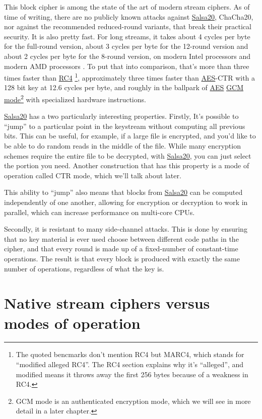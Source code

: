\documentclass[11pt,ebook,table,dvipsnames]{memoir}
\begin{document}
This block cipher is among the state of the art of modern stream
ciphers. As of time of writing, there are no publicly known attacks
against \hyperref[Salsa20]{Salsa20}, ChaCha20, nor against the recommended reduced-round
variants, that break their practical security. It is also pretty fast.
For long streams, it takes about 4 cycles per byte for the full-round
version, about 3 cycles per byte for the 12-round version and about 2
cycles per byte for the 8-round version, on modern Intel processors
\cite{salsa20:speed} and modern AMD processors \cite{cryptopp:bench}.
To put that into comparison, that's more than three times faster than
\hyperref[RC4]{RC4} \footnote{The quoted bencmarks don't mention RC4 but MARC4, which
stands for \enquote{modified alleged RC4}. The RC4 section explains why it's
\enquote{alleged}, and modified means it throws away the first 256 bytes
because of a weakness in RC4.}, approximately three times faster than
\hyperref[AES]{AES}-CTR with a 128 bit key at 12.6 cycles per byte, and roughly in the
ballpark of \hyperref[AES]{AES} \hyperref[GCM-mode]{GCM mode}\footnote{GCM mode is an authenticated encryption
mode, which we will see in more detail in a later chapter.} with
specialized hardware instructions.

\label{keystream-jump}
\hyperref[Salsa20]{Salsa20} has a two particularly interesting properties. Firstly, It's
possible to \enquote{jump} to a particular point in the keystream without
computing all previous bits. This can be useful, for example, if a
large file is encrypted, and you'd like to be able to do random reads
in the middle of the file. While many encryption schemes require the
entire file to be decrypted, with \hyperref[Salsa20]{Salsa20}, you can just select the
portion you need. Another construction that has this property is a
mode of operation called \gls{CTR mode}, which we'll talk about later.

This ability to \enquote{jump} also means that blocks from \hyperref[Salsa20]{Salsa20} can be
computed independently of one another, allowing for encryption or
decryption to work in parallel, which can increase performance on
multi-core CPUs.

Secondly, it is resistant to many side-channel attacks. This is
done by ensuring that no key material is ever used choose between
different code paths in the cipher, and that every round is made up
of a fixed-number of constant-time operations. The result is that
every block is produced with exactly the same number of operations,
regardless of what the key is.
\section{Native stream ciphers versus modes of operation}
\label{sec-2-3-11}
\end{document}
